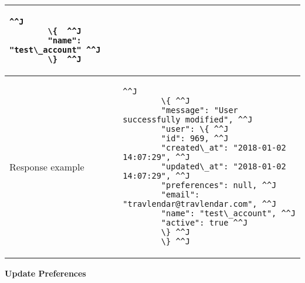 \begin{tabularx}{\linewidth}{| l | l |}
{		\bigskip
		\begin{lstlisting}^^J
		\{  ^^J
		"name": "test\_account" ^^J
		\}  ^^J
		\end{lstlisting}
	}  \\
	\hline
	Response example & 
	\parbox{0.8\textwidth}{
		\bigskip
		\begin{lstlisting}^^J
		\{ ^^J
		"message": "User successfully modified", ^^J
		"user": \{ ^^J
		"id": 969, ^^J
		"created\_at": "2018-01-02 14:07:29", ^^J
		"updated\_at": "2018-01-02 14:07:29", ^^J
		"preferences": null, ^^J
		"email": "travlendar@travlendar.com", ^^J
		"name": "test\_account", ^^J
		"active": true ^^J
		\} ^^J
		\} ^^J
		\end{lstlisting}
	}  \\
	\hline
\end{tabularx}
\newpage
\textbf{Update Preferences}

